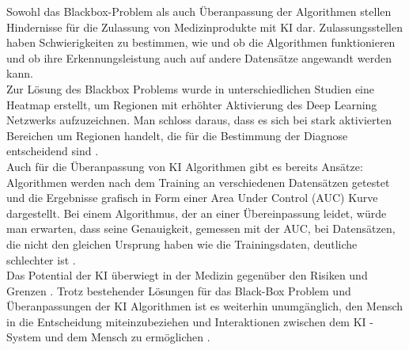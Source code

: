 Sowohl das Blackbox-Problem als auch Überanpassung der Algorithmen stellen Hindernisse für die Zulassung von Medizinprodukte mit KI dar. Zulassungsstellen haben Schwierigkeiten zu bestimmen, wie und ob die Algorithmen funktionieren und ob ihre Erkennungsleistung auch auf andere Datensätze angewandt werden kann.\\
Zur Lösung des Blackbox Problems wurde in unterschiedlichen Studien eine Heatmap erstellt, um Regionen mit erhöhter Aktivierung des Deep Learning Netzwerks aufzuzeichnen. Man schloss daraus, dass es sich bei stark aktivierten Bereichen um Regionen handelt, die für die Bestimmung der Diagnose entscheidend sind \cite{AI_where_are_we_now}.\\
Auch für die Überanpassung von KI Algorithmen gibt es bereits Ansätze: Algorithmen werden nach dem Training an verschiedenen Datensätzen getestet\cite{AI_where_are_we_now} und die Ergebnisse grafisch in Form einer Area Under Control (AUC)  Kurve dargestellt. Bei einem Algorithmus, der an einer Übereinpassung leidet, würde man erwarten, dass seine Genauigkeit, gemessen mit der AUC, bei Datensätzen, die nicht den gleichen Ursprung haben wie die Trainingsdaten, deutliche schlechter ist \cite{AI_where_are_we_now}.\\

Das Potential der KI überwiegt in der Medizin  gegenüber den Risiken und Grenzen  \cite{Chapter_14}. Trotz bestehender Lösungen für das Black-Box Problem und Überanpassungen der KI Algorithmen ist es weiterhin unumgänglich, den Mensch in die Entscheidung miteinzubeziehen und Interaktionen zwischen dem KI - System und dem Mensch zu ermöglichen
\cite{AI_where_are_we_now}.
